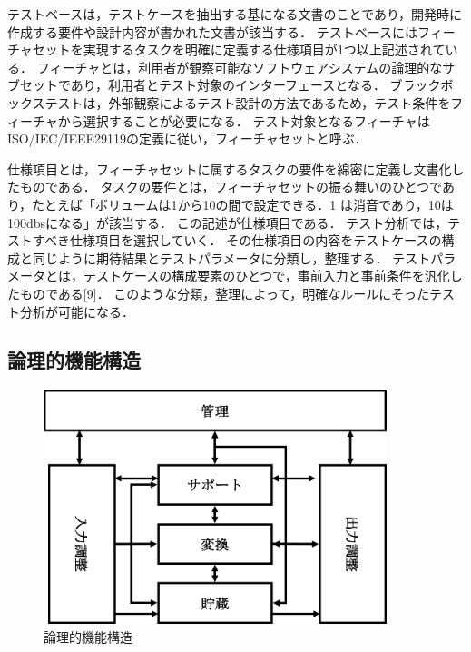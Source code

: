 テストベースは，テストケースを抽出する基になる文書のことであり，開発時に作成する要件や設計内容が書かれた文書が該当する．
テストベースにはフィーチャセットを実現するタスクを明確に定義する仕様項目が1つ以上記述されている．
フィーチャとは，利用者が観察可能なソフトウェアシステムの論理的なサブセットであり，利用者とテスト対象のインターフェースとなる\cite{kang1990feature}．
ブラックボックステストは，外部観察によるテスト設計の方法であるため，テスト条件をフィーチャから選択することが必要になる．
テスト対象となるフィーチャはISO/IEC/IEEE29119の定義に従い，フィーチャセットと呼ぶ\cite{29119}．

仕様項目とは，フィーチャセットに属するタスクの要件を綿密に定義し文書化したものである．
タスクの要件とは，フィーチャセットの振る舞いのひとつであり，たとえば「ボリュームは1から10の間で設定できる．1 は消音であり，10は100dbsになる」が該当する．
この記述が仕様項目である．
テスト分析では，テストすべき仕様項目を選択していく．
その仕様項目の内容をテストケースの構成と同じように期待結果とテストパラメータに分類し，整理する．
テストパラメータとは，テストケースの構成要素のひとつで，事前入力と事前条件を汎化したものである[9]．
このような分類，整理によって，明確なルールにそったテスト分析が可能になる．

\subsection{論理的機能構造}

\begin{figure}[htbp]
  \begin{center}
	\includegraphics[width=10cm]{./image/D-2-FigLSOF.png}
	\caption{論理的機能構造}
	\label{fig:D-2-FigLSOF}
  \end{center}
\end{figure}

